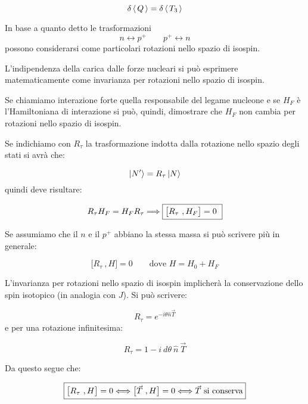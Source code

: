 \begin{equation*}
  \delta \left\langle\, Q \,\right\rangle = \delta \left\langle\, T_3 \,\right\rangle
\end{equation*}

In base a quanto detto le trasformazioni
\begin{equation*}
n  \longleftrightarrow p^+ \qquad p^+  \longleftrightarrow n
\end{equation*}
possono considerarsi come particolari rotazioni nello spazio di isospin. 

L'indipendenza della carica dalle forze nucleari si può esprimere
matematicamente come invarianza per rotazioni nello spazio di isospin.

Se chiamiamo interazione forte quella responsabile del legame nucleone e se
$H_F$ è l'Hamiltoniana di interazione si può, quindi, dimostrare che $H_F$ non
cambia per rotazioni nello spazio di isospin. 

Se indichiamo con $R_\tau$ la trasformazione indotta dalla rotazione nello
spazio degli stati si avrà che:

\begin{equation*}
\Ket{N'} = R_\tau \Ket{N}
\end{equation*}
quindi deve risultare:

\begin{equation*}
R_\tau H_F = H_F R_\tau \Longrightarrow \fbox{$\bigl[R_\tau \ , H_F \bigr] = 0$ 
}
\end{equation*}

Se assumiamo che il $n$ e il $p^+$ abbiano la stessa massa si può scrivere più
in generale:

\begin{equation*}
  \bigl[R_\tau \ , H \bigr] = 0 \qquad \text{dove } H = H_0 + H_F
\end{equation*}

L'invarianza per rotazioni nello spazio di isospin implicherà la conservazione 
dello spin isotopico (in analogia con $J$). Si può scrivere: 

\begin{equation*}
R_\tau = e^{-i \theta \hat{n} \vec{T}}
\end{equation*}
e per una rotazione infinitesima:

\begin{equation*}
R_\tau= 1 - i \ d\theta \ \hat{n} \ \vec{T}
\end{equation*}

Da questo segue che:

\begin{equation*}
\fbox{$\bigl[R_\tau \ , H \bigr] = 0 \Longleftrightarrow \bigl[\vec{T} \ , H 
\bigr] = 0 \Longleftrightarrow \vec{T}$ si  conserva}
\end{equation*}


